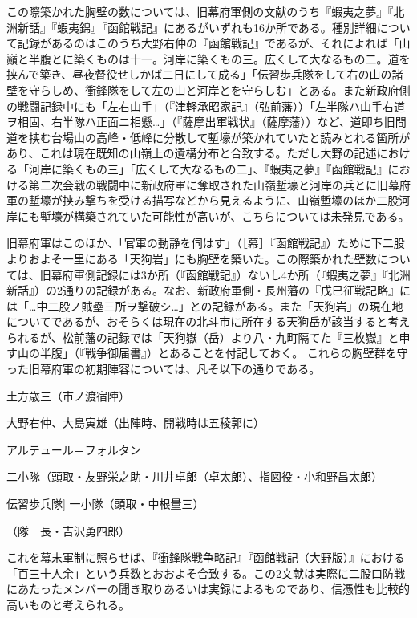 \documentclass[11pt,report]{jsarticle}
\begin{document}
この際築かれた胸壁の数については、旧幕府軍側の文献のうち『蝦夷之夢』『北洲新話』『蝦夷錦』『函館戦記』にあるがいずれも16か所である。種別詳細について記録があるのはこのうち大野右仲の『函館戦記』であるが、それによれば「山巓と半腹とに築くものは十一。河岸に築くもの三。広くして大なるもの二。道を挟んで築き、昼夜督役せしかば二日にして成る」「伝習歩兵隊をして右の山の諸壁を守らしめ、衝鋒隊をして左の山と河岸とを守らしむ」とある。また新政府側の戦闘記録中にも「左右山手」（『津軽承昭家記』（弘前藩））「左半隊ハ山手右道ヲ相固、右半隊ハ正面ニ相懸…」（『薩摩出軍戦状』（薩摩藩））など、道即ち旧間道を挟む台場山の高峰・低峰に分散して塹壕が築かれていたと読みとれる箇所があり、これは現在既知の山嶺上の遺構分布と合致する。ただし大野の記述における「河岸に築くもの三」「広くして大なるもの二」、『蝦夷之夢』『函館戦記』における第二次会戦の戦闘中に新政府軍に奪取された山嶺塹壕と河岸の兵とに旧幕府軍の塹壕が挟み撃ちを受ける描写などから見えるように、山嶺塹壕のほか二股河岸にも塹壕が構築されていた可能性が高いが、こちらについては未発見である。

旧幕府軍はこのほか、「官軍の動静を伺はす」（［幕］『函館戦記』）ために下二股よりおよそ一里にある「天狗岩」にも胸壁を築いた。この際築かれた壁数については、旧幕府軍側記録には3か所（『函館戦記』）ないし4か所（『蝦夷之夢』『北洲新話』）の2通りの記録がある。なお、新政府軍側・長州藩の『戊巳征戦記略』には「…中二股ノ賊壘三所ヲ撃破シ…」との記録がある。また「天狗岩」の現在地についてであるが、おそらくは現在の北斗市に所在する天狗岳が該当すると考えられるが、松前藩の記録では「天狗嶽（岳）より八・九町隔てた『三枚嶽』と申す山の半腹」（『戦争御届書』）とあることを付記しておく。
これらの胸壁群を守った旧幕府軍の初期陣容については、凡そ以下の通りである。

\begin{description}
\item [陸軍奉行並] 土方歳三（市ノ渡宿陣）
\item [同　添　役] 大野右仲、大島寅雄（出陣時、開戦時は五稜郭に）
\item [陸軍改役下役] アルテュール＝フォルタン
\item [衝鋒隊]	二小隊（頭取・友野栄之助・川井卓郎（卓太郎）、指図役・小和野昌太郎）
\item 伝習歩兵隊] 一小隊（頭取・中根量三）
\item [砲兵隊]
\item [工兵隊] （隊　長・吉沢勇四郎）
\end{description}

これを幕末軍制に照らせば、『衝鋒隊戦争略記』『函館戦記（大野版）』における「百三十人余」という兵数とおおよそ合致する。この2文献は実際に二股口防戦にあたったメンバーの聞き取りあるいは実録によるものであり、信憑性も比較的高いものと考えられる。
\end{document}
